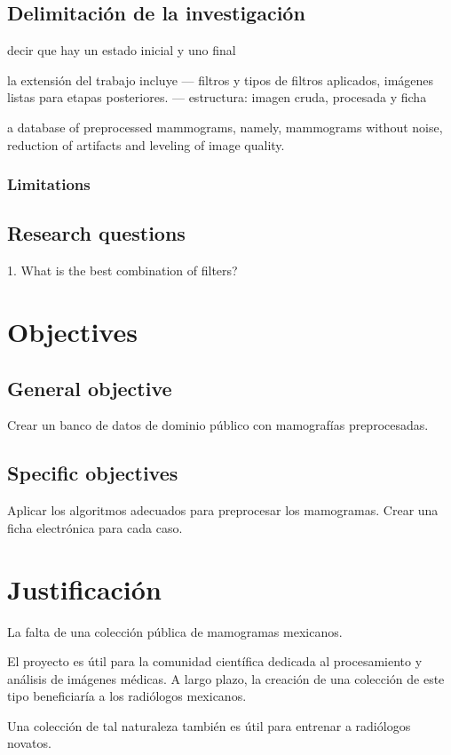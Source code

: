 \subsection{Delimitación de la investigación}

decir que hay un estado inicial y uno final

la extensión del trabajo incluye --- filtros y tipos de filtros aplicados, imágenes listas para etapas posteriores. 
 --- estructura: imagen cruda, procesada y ficha

a database of preprocessed mammograms, namely, mammograms without noise,
reduction of artifacts and leveling of image quality.

\subsubsection{Limitations}

\subsection{Research questions}

1. What is the best combination of filters?

\section{Objectives}
\subsection{General objective}

Crear un banco de datos de dominio público con mamografías preprocesadas.

\subsection{Specific objectives}

Aplicar los algoritmos adecuados para preprocesar los mamogramas.
Crear una ficha electrónica para cada caso.

\section{Justificación}

La falta de una colección pública de mamogramas mexicanos.

El proyecto es útil para la comunidad científica dedicada al procesamiento y
análisis de imágenes médicas. A largo plazo, la creación de una colección de
este tipo beneficiaría a los radiólogos mexicanos.

Una colección de tal naturaleza también es útil para entrenar a radiólogos
novatos.

